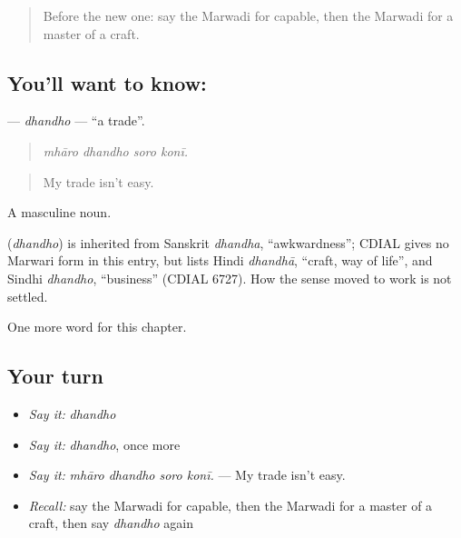 \begin{quote}
Before the new one: say the Marwadi for capable, then the Marwadi for a master of a craft.
\end{quote}

\subsection*{You'll want to know: }
\textbf{} — \emph{dhandho} — \textquotedblleft{}a trade\textquotedblright{}.

\begin{quote}
   
\end{quote}

\begin{quote}
\emph{mhāro dhandho soro konī.}
\end{quote}

\begin{quote}
My trade isn't easy.
\end{quote}

A masculine noun.

\begin{cousinweb}
\textbf{} (\emph{dhandho}) is inherited from Sanskrit \emph{dhandha}, \textquotedblleft{}awkwardness\textquotedblright{}; CDIAL gives no Marwari form in this entry, but lists Hindi \emph{dhandhā}, \textquotedblleft{}craft, way of life\textquotedblright{}, and Sindhi \emph{dhandho}, \textquotedblleft{}business\textquotedblright{} (CDIAL 6727). How the sense moved to work is not settled.
\end{cousinweb}

\begin{grammarlens}[title={What you've built}]
One more word for this chapter.
\end{grammarlens}

\subsection*{Your turn}
\begin{itemize}
\raggedright
  \item \emph{Say it:} \emph{dhandho}
  \item \emph{Say it:} \emph{dhandho}, once more
  \item \emph{Say it:} \emph{mhāro dhandho soro konī.} — My trade isn't easy.
  \item \emph{Recall:} say the Marwadi for capable, then the Marwadi for a master of a craft, then say \emph{dhandho} again
\end{itemize}

